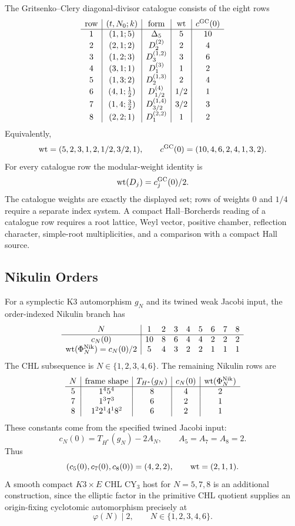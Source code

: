 The Gritsenko--Clery diagonal-divisor catalogue consists of the eight
rows
\[
\begin{array}{c|c|c|c|c}
\mathrm{row} & (t,N_0;k) & \mathrm{form} & \mathrm{wt} & c^{\mathrm{GC}}(0) \\
\hline
1 & (1,1;5) & \Delta_5 & 5 & 10 \\
2 & (2,1;2) & D_2^{(2)} & 2 & 4 \\
3 & (1,2;3) & D_3^{(1,2)} & 3 & 6 \\
4 & (3,1;1) & D_1^{(3)} & 1 & 2 \\
5 & (1,3;2) & D_2^{(1,3)} & 2 & 4 \\
6 & (4,1;\tfrac12) & D_{1/2}^{(4)} & 1/2 & 1 \\
7 & (1,4;\tfrac32) & D_{3/2}^{(1,4)} & 3/2 & 3 \\
8 & (2,2;1) & D_1^{(2,2)} & 1 & 2
\end{array}
\]
Equivalently,
\[
  \mathrm{wt}=(5,2,3,1,2,1/2,3/2,1),
  \qquad
  c^{\mathrm{GC}}(0)=(10,4,6,2,4,1,3,2).
\]
For every catalogue row the modular-weight identity is
\[
  \mathrm{wt}(D_j)=c_j^{\mathrm{GC}}(0)/2.
\]
The catalogue weights are exactly the displayed set; rows of weights
$0$ and $1/4$ require a separate index system. A compact
Hall--Borcherds reading of a
catalogue row requires a root lattice, Weyl vector, positive chamber,
reflection character, simple-root multiplicities, and a comparison with
a compact Hall source.

\subsection*{Nikulin Orders}

For a symplectic K3 automorphism $g_N$ and its twined weak Jacobi input,
the order-indexed Nikulin branch has
\[
\begin{array}{c|cccccccc}
N & 1 & 2 & 3 & 4 & 5 & 6 & 7 & 8 \\ \hline
c_N(0) & 10 & 8 & 6 & 4 & 4 & 2 & 2 & 2 \\
\mathrm{wt}(\Phi_N^{\mathrm{Nik}})=c_N(0)/2
& 5 & 4 & 3 & 2 & 2 & 1 & 1 & 1
\end{array}
\]
The CHL subsequence is $N\in\{1,2,3,4,6\}$. The remaining Nikulin rows are
\[
\begin{array}{c|c|c|c|c}
N & \mathrm{frame\ shape} & T_{H^*}(g_N) & c_N(0) &
\mathrm{wt}(\Phi_N^{\mathrm{Nik}}) \\ \hline
5 & 1^4 5^4 & 8 & 4 & 2 \\
7 & 1^3 7^3 & 6 & 2 & 1 \\
8 & 1^2 2^1 4^1 8^2 & 6 & 2 & 1
\end{array}
\]
These constants come from the specified twined Jacobi input:
\[
  c_N(0)=T_{H^*}(g_N)-2A_N,\qquad A_5=A_7=A_8=2.
\]
Thus
\[
  (c_5(0),c_7(0),c_8(0))=(4,2,2),
  \qquad
  \mathrm{wt}=(2,1,1).
\]
A smooth compact $K3\times E$ CHL CY$_3$ host for $N=5,7,8$ is an
additional construction, since the elliptic factor in the primitive CHL
quotient supplies an origin-fixing cyclotomic automorphism precisely at
\[
  \varphi(N)\mid2,\qquad N\in\{1,2,3,4,6\}.
\]

